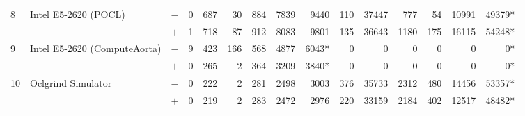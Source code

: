 \begin{tabular}{lll | rrrrrr | rrrrrr }
\hline
\multirow{ 2}{*}{8} & \multirow{ 2}{*}{Intel E5-2620 (POCL)} & $-$ & 0 & 687 & 30 & 884 & 7839 & 9440       & 110 & 37447 & 777 & 54 & 10991 & 49379* \\& & $+$ & 1 & 718 & 87 & 912 & 8083 & 9801 & 135 & 36643 & 1180 & 175 & 16115 & 54248* \\
\hline
\multirow{ 2}{*}{9} & \multirow{ 2}{*}{Intel E5-2620 (ComputeAorta)} & $-$ & 9 & 423 & 166 & 568 & 4877 & 6043*       & 0 & 0 & 0 & 0 & 0 & 0* \\& & $+$ & 0 & 265 & 2 & 364 & 3209 & 3840* & 0 & 0 & 0 & 0 & 0 & 0* \\
\hline
\multirow{ 2}{*}{10} & \multirow{ 2}{*}{Oclgrind Simulator} & $-$ & 0 & 222 & 2 & 281 & 2498 & 3003       & 376 & 35733 & 2312 & 480 & 14456 & 53357* \\& & $+$ & 0 & 219 & 2 & 283 & 2472 & 2976 & 220 & 33159 & 2184 & 402 & 12517 & 48482* \\
  \bottomrule
\end{tabular}

